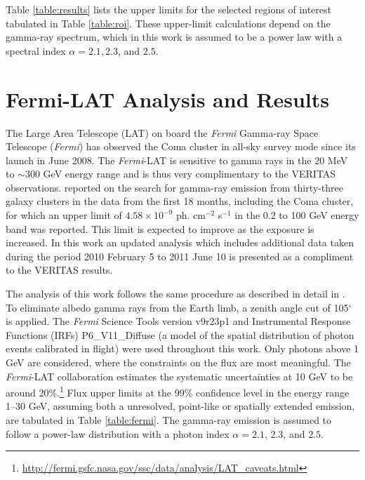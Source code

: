 \documentclass[12pt,manuscript]{aastex}
\begin{document}
Table \ref{table:results} lists the upper limits for the selected regions of interest tabulated in Table \ref{table:roi}. These upper-limit calculations depend on the gamma-ray spectrum, which in this work is assumed to be a power law with a spectral index $\alpha=2.1, 2.3$, and $2.5$.

\section{Fermi-LAT Analysis and Results}
The Large Area Telescope (LAT) on board the \emph{Fermi} Gamma-ray Space Telescope (\emph{Fermi}) has observed the Coma cluster in all-sky survey mode since its launch in June 2008. The \emph{Fermi}-LAT is sensitive to gamma rays in the 20 MeV to $\sim$300 GeV energy range and is thus very complimentary to the VERITAS observations. \citet{article:Ackermann_etal:2010} reported on the search for gamma-ray emission from thirty-three galaxy clusters in the data from the first 18 months, including the Coma cluster, for which an upper limit of $4.58\times 10^{-9}$ ph. cm$^{-2}$ s$^{-1}$ in the 0.2 to 100 GeV energy band was reported. This limit is expected to improve as the exposure is increased. In this work an updated analysis which includes additional data taken during the period 2010 February 5 to 2011 June 10 is presented as a compliment to the VERITAS results.

The analysis of this work follows the same procedure as described in detail in \citet{article:Abdo_etal:2009}. To eliminate albedo gamma rays from the Earth limb, a zenith angle cut of 105$^{\circ}$ is applied. The \emph{Fermi} Science Tools version v9r23p1 and Instrumental Response Functions (IRFs) P6\_V11\_Diffuse (a model of the spatial distribution of photon events calibrated  in flight) were used throughout this work. Only photons above 1 GeV are considered, where the constraints on the flux are most meaningful. The \emph{Fermi}-LAT collaboration estimates the systematic uncertainties at 10 GeV to be around 20\%.\footnote{\url{http://fermi.gsfc.nasa.gov/ssc/data/analysis/LAT\_caveats.html}} Flux upper limits at the 99\% confidence level in the energy range 1--30 GeV, assuming both a unresolved, point-like or spatially extended emission, are tabulated in Table \ref{table:fermi}. The gamma-ray emission is assumed to follow a power-law distribution with a photon index $\alpha=2.1$, 2.3, and $2.5$.
\end{document}
